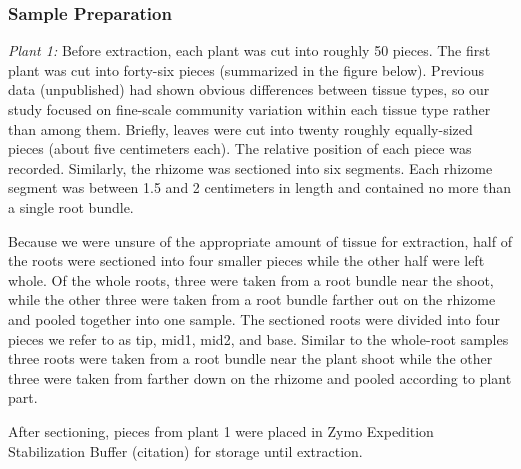 \subsubsection{Sample Preparation}

\textit{Plant 1:} Before extraction, each plant was cut into roughly 50 pieces. The first plant was cut into forty-six pieces (summarized in the figure below). Previous data (unpublished) had shown obvious differences between tissue types, so our study focused on fine-scale community variation within each tissue type rather than among them. Briefly, leaves were cut into twenty roughly equally-sized pieces (about five centimeters each). The relative position of each piece was recorded. Similarly, the rhizome was sectioned into six segments. Each rhizome segment was between 1.5 and 2 centimeters in length and contained no more than a single root bundle.
    
Because we were unsure of the appropriate amount of tissue for extraction, half of the roots were sectioned into four smaller pieces while the other half were left whole. Of the whole roots, three were taken from a root bundle near the shoot, while the other three were taken from a root bundle farther out on the rhizome and pooled together into one sample. The sectioned roots were divided into four pieces we refer to as tip, mid1, mid2, and base. Similar to the whole-root samples three roots were taken from a root bundle near the plant shoot while the other three were taken from farther down on the rhizome and pooled according to plant part.

After sectioning, pieces from plant 1 were placed in Zymo Expedition Stabilization Buffer (citation) for storage until extraction.    
    